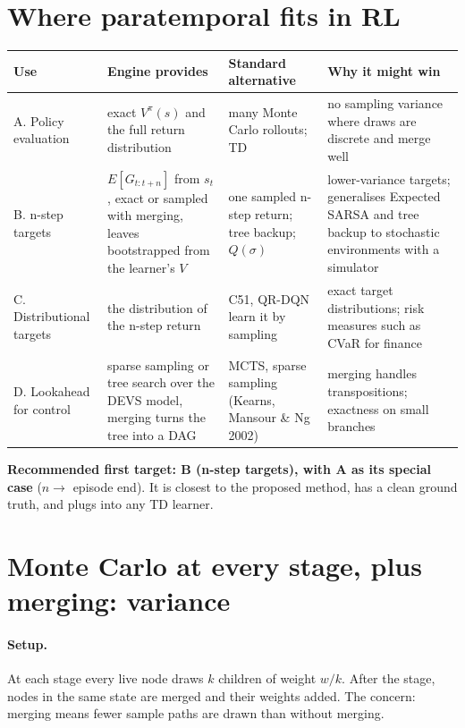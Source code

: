 \documentclass[11pt]{article}
\begin{document}
\section{Where paratemporal fits in RL}
\begin{center}
\small
\begin{tabularx}{\linewidth}{@{}p{2.6cm} Y Y Y@{}}
\toprule
\textbf{Use} & \textbf{Engine provides} & \textbf{Standard alternative} & \textbf{Why it might win}\\
\midrule
A. Policy evaluation & exact $V^\pi(s)$ and the full return distribution & many Monte Carlo rollouts; TD & no sampling variance where draws are discrete and merge well\\
B. n-step targets & $E[G_{t:t+n}]$ from $s_t$, exact or sampled with merging, leaves bootstrapped from the learner's $V$ & one sampled n-step return; tree backup; $Q(\sigma)$ & lower-variance targets; generalises Expected SARSA and tree backup to stochastic environments with a simulator\\
C. Distributional targets & the distribution of the n-step return & C51, QR-DQN learn it by sampling & exact target distributions; risk measures such as CVaR for finance\\
D. Lookahead for control & sparse sampling or tree search over the DEVS model, merging turns the tree into a DAG & MCTS, sparse sampling (Kearns, Mansour \& Ng 2002) & merging handles transpositions; exactness on small branches\\
\bottomrule
\end{tabularx}
\end{center}
\textbf{Recommended first target: B (n-step targets), with A as its special case} ($n\to$ episode end). It is closest
to the proposed method, has a clean ground truth, and plugs into any TD learner.

\section{Monte Carlo at every stage, plus merging: variance}
\label{sec:variance}

\paragraph{Setup.} At each stage every live node draws $k$ children of weight $w/k$. After the stage, nodes in the same
state are merged and their weights added. The concern: merging means fewer sample paths are drawn than without merging.
\end{document}

